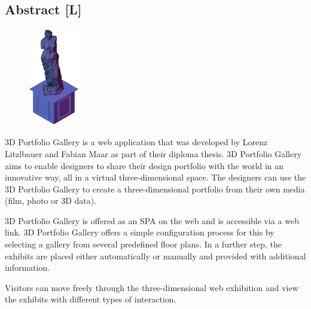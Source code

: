 \begin{spacing}{1}
    \chapter*{Abstract [L]}
\end{spacing}
\begin{figure}
    \begin{center}
      \includegraphics[width=0.2\textwidth]{pics/statue.png}
    \end{center}
\end{figure}
3D Portfolio Gallery is a web application that was developed by Lorenz Litzlbauer and Fabian Maar as part of their diploma thesis. 3D Portfolio Gallery aims to enable designers to share their design portfolio with the world in an innovative way, all in a virtual three-dimensional space. The designers can use the 3D Portfolio Gallery to create a three-dimensional portfolio from their own media (film, photo or 3D data).

3D Portfolio Gallery is offered as an SPA on the web and is accessible via a web link. 3D Portfolio Gallery offers a simple configuration process for this by selecting a gallery from several predefined floor plans. In a further step, the exhibits are placed either automatically or manually and provided with additional information.

Visitors can move freely through the three-dimensional
web exhibition and view the exhibits with different types of interaction.


